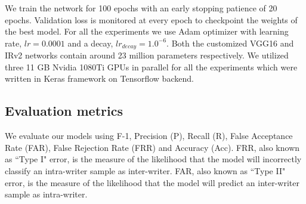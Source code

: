 \documentclass[a4paper,conference]{IEEEtran}
\begin{document}
\indent We train the network for 100 epochs with an early stopping patience of 20 epochs. Validation loss is monitored at every epoch to checkpoint the weights of the best model. For all the experiments we use Adam optimizer with learning rate, $lr = 0.0001$ and a decay, $lr_{decay}=1.0^{-6}$. Both the customized VGG16 and IRv2 networks contain around 23 million parameters respectively. We utilized three 11 GB Nvidia 1080Ti GPUs in parallel for all the experiments which were written in Keras framework on Tensorflow backend.

\subsection{Evaluation metrics}
We evaluate our models using F-1, Precision (P), Recall (R), False Acceptance Rate (FAR), False Rejection Rate (FRR) and Accuracy (Acc). FRR, also known as ``Type I" error, is the measure of the likelihood that the model will incorrectly classify an intra-writer sample as inter-writer. FAR, also known as ``Type II" error, is the measure of the likelihood that the model will predict an inter-writer sample as intra-writer. 
\end{document}
